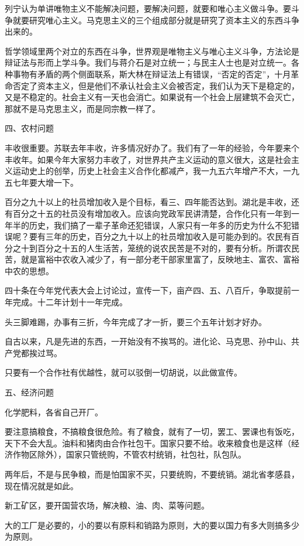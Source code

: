 列宁认为单讲唯物主义不能解决问题，要解决问题，就要和唯心主义做斗争。要斗争就要研究唯心主义。马克思主义的三个组成部分就是研究了资本主义的东西斗争出来的。

哲学领域里两个对立的东西在斗争，世界观是唯物主义与唯心主义斗争，方法论是辩证法与形而上学斗争。我们与蒋介石是对立统一；与民主人士也是对立统一。各种事物有矛盾的两个侧面联系，斯大林在辩证法上有错误，“否定的否定”，十月革命否定了资本主义，但是他们不承认社会主义会被否定，我们认为天下是稳定的，又是不稳定的。社会主义有一天也会消亡。如果说有一个社会上层建筑不会灭亡，那就不是马克思主义，而是同宗教一样了。

四、农村问题

丰收很重要。苏联去年丰收，许多情况好办了。我们有了一年的经验，今年要来个丰收年。如果今年大家努力丰收了，对世界共产主义运动的意义很大，这是社会主义运动史上的创举，历史上社会主义合作化都减产，我一九五六年增产不大，一九五七年要大增一下。

百分之九十以上的社员增加收入是个目标，看三、四年能否达到。湖北是丰收，还有百分之十五的社员没有增加收入。应该向党政军民讲清楚，合作化只有一年到一年半的历史，我们搞了一辈子革命还犯错误，人家只有一年多的历史为什么不犯错误呢？要有三年的历史，百分之九十以上的社员增加收入是可能办到的。农民有百分之十到百分之十五的人生活苦，笼统的说农民苦是不对的，要有分析。所谓农民苦，就是富裕中农收入减少了，有一部分老干部家里富了，反映地主、富农、富裕中农的思想。

四十条在今年党代表大会上讨论过，宣传一下，亩产四、五、八百斤，争取提前一年完成。十二年计划十一年完成。

头三脚难踢，办事有三折，今年完成了才一折，要三个五年计划才好办。

自古以来，凡是先进的东西，一开始没有不挨骂的。进化论、马克思、孙中山、共产党都挨过骂。

只要有一个合作社有优越性，就可以驳倒一切胡说，以此做宣传。

五、经济问题

化学肥料，各省自己开厂。

要注意搞粮食，不搞粮食很危险。有了粮食，就有了一切，罢工、罢课也有饭吃，天下不会大乱。油料和猪肉由合作社包干。国家只要不给。收来粮食也是这样（经济作物区除外），国家只管统购，不管农村统销，社包社，队包队。

两年后，不是与民争粮，而是怕国家不买，只要统购，不要统销。湖北省孝感县，现在情况就是如此。

新工矿区，要开国营农场，解决粮、油、肉、菜等问题。

大的工厂是必要的，小的要以有原料和销路为原则，大的要以国力有多大则搞多少为原则。

